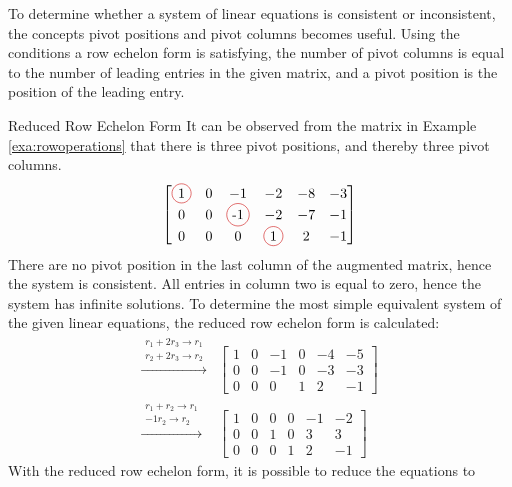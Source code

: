 To determine whether a system of linear equations is consistent or inconsistent, the concepts pivot positions and pivot columns
becomes useful. Using the conditions a row echelon form is satisfying, the number of pivot columns is equal to the number of leading entries in the given matrix, and a pivot position is the position of the leading entry.  
\begin{example}{Reduced Row Echelon Form}
It can be observed from the matrix in Example \ref{exa:rowoperations} that there is three pivot positions, and thereby three pivot columns.
\begin{align}
     \begin{bmatrix}
  	 \circled{1} & 0 & -1 &-2 & -8 & -3 \\
 	 0 & 0 & \circled{-1} & -2 & -7 & -1 \\
	 0 &0 & 0 & \circled{1} & 2 & -1
       \end{bmatrix}
\label{examplepivot}
\end{align}
There are no pivot position in the last column of the augmented matrix, hence the system is consistent. All entries in column two is equal to zero, hence the system has infinite solutions. To determine the most simple equivalent system of the given linear equations, the reduced row echelon form is calculated:
\begin{align*}
  \xrightarrow{\substack{r_1+2r_3\rightarrow r_1\\r_2+2r_3\rightarrow r_2}}
    &\begin{bmatrix}
  	    1 & 0 & -1 &0 & -4 & -5 \\
 	    0 & 0 & -1 & 0 & -3 & -3 \\
	    0 &0 & 0 & 1 & 2 & -1
     \end{bmatrix}\\
  \xrightarrow{\substack{r_1+r_2\rightarrow r_1\\-1r_2\rightarrow r_2}}
  &\begin{bmatrix}
        1 & 0 & 0 &0 & -1 & -2 \\
 	    0 & 0 & 1 & 0 & 3 & 3 \\
	    0 &0 & 0 & 1 & 2 & -1
     \end{bmatrix}
    \end{align*}
With the reduced row echelon form, it is possible to reduce the equations to


\end{example}
